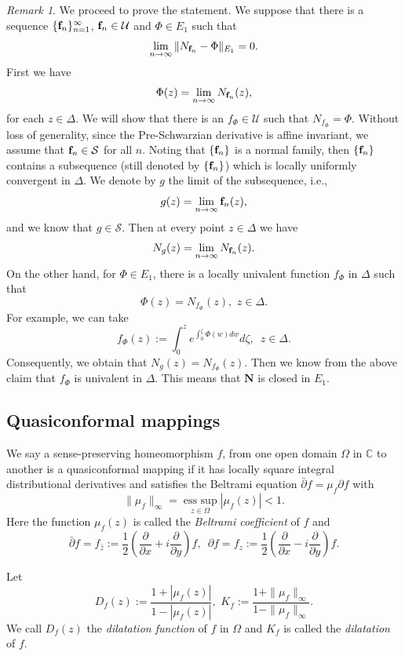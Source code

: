 \documentclass[11pt]{amsart}
\theoremstyle{remark}
\newtheorem{remark}[theorem]{Remark}
\theoremstyle{claim}
\theoremstyle{definition}
\theoremstyle{problem}
\theoremstyle{conjecture}
\theoremstyle{question}
\numberwithin{equation}{section}
\begin{document}
\begin{remark}
We proceed to prove the statement.  We suppose that there is a sequence $\{{\bf f}_n\}_{n=1}^{\infty}$, ${\bf f}_n\in \mathcal{U}$ and ${\Phi}\in E_1$ such that $$\lim\limits_{n\rightarrow \infty}\|N_{{\bf f}_n}-\Phi\|_{E_1}=0.$$
First we have
$$\Phi(z)=\lim\limits_{n\rightarrow \infty}N_{{\bf f}_{n}}(z),$$
for each $z\in \Delta$. We will show that there is an $f_{\Phi}\in \mathcal{U}$ such that $N_{f_{\Phi}}=\Phi$. Without loss of generality,  since the Pre-Schwarzian derivative is affine invariant, we assume that ${\bf f}_n \in \mathcal{S}$ for all $n$.
Noting that $\{{\bf f}_n\}$ is a normal family, then $\{{\bf f}_n\}$ contains a subsequence (still denoted by $\{{\bf f}_n\}$) which is locally uniformly convergent in $\Delta$. We denote by $g$ the limit of the subsequence, i.e.,
$$g(z)=\lim\limits_{n\rightarrow \infty}{\bf f}_{n}(z), $$
and we know that $g\in \mathcal{S}$. Then at every point $z\in \Delta$ we have
$$N_{g}(z)=\lim\limits_{n\rightarrow \infty}N_{{\bf f}_{n}}(z).$$
On the other hand, for $\Phi\in E_1$, there is a locally univalent function $f_{\Phi}$ in $\Delta$ such that $$\Phi(z)=N_{f_{\Phi}}(z),\,\, z\in \Delta.$$
For example, we can take
$$f_{\Phi}(z):=\int_{0}^{z} e^{\int_{0}^{\zeta}\Phi(w) dw}d\zeta, \,\,\,z\in\Delta.$$
Consequently, we obtain that $N_g(z)=N_{f_{\Phi}}(z).$
Then we know from the above claim that $f_{\Phi}$ is univalent in $\Delta$.  This means that $\mathbf{N}$ is closed in $E_1$.
\end{remark}

\subsection{Quasiconformal mappings} We say a sense-preserving homeomorphism $f$,  from one open domain $\Omega$ in
$\mathbb{C}$ to another is a quasiconformal mapping if it has locally square
integral distributional derivatives and satisfies the Beltrami equation $\bar{\partial}f=\mu_f  \partial{f}$ with
$$\|\mu_f\|_{\infty}=\mathop{\text {ess sup}}\limits_{z\in \Omega} |\mu_f(z)|<1.$$
Here the function $\mu_f(z)$ is called the {\em  Beltrami coefficient} of $f$ and
$$\bar{\partial}f=f_{\bar{z}} :=\frac{1}{2}\left(\frac{\partial}{\partial x}+i\frac{\partial}{\partial y}\right)f,\,\,\, \partial f=f_{z} :=\frac{1}{2}\left(\frac{\partial}{\partial x}-i\frac{\partial}{\partial y}\right)f.$$

Let
$$D_f(z):=\frac{1+|\mu_f(z)|}{1-|\mu_f(z)|}, \,\,K_f:= \frac{1+\|\mu_f\|_{\infty}}{1-\|\mu_f\|_{\infty}}.$$
We call $D_f(z)$ the {\em dilatation function} of $f$ in $\Omega$ and $K_f$ is called the {\em dilatation} of $f$.
\end{document}
